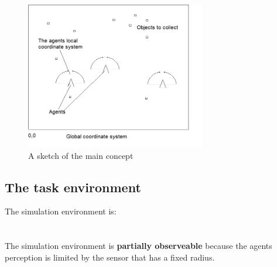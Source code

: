 \documentclass[10pt,a4paper,DIV=11]{scrreprt}
\begin{document}
\begin{center}
	\begin{figure}[H]
		\centering
		\includegraphics[width=0.7\textwidth,scale=1.0]{files/main-concept.png}  
		\caption{A sketch of the main concept}
		\label{fig:concept-main}
	\end{figure}
\end{center}

\subsection{The task environment}
The simulation environment is: \\

   \\
\\

The simulation environment is \textbf{partially observeable} because the agents perception is limited by the sensor that has a fixed radius. \\
\end{document}
